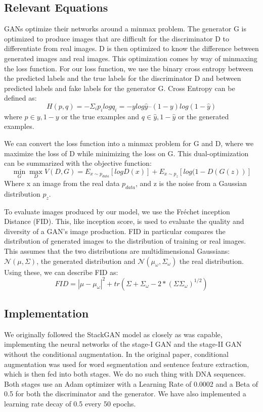 \documentclass{article}
\begin{document}
	\subsection{Relevant Equations}
	\label{sec:equations}
	GANs optimize their networks around a minmax problem. The generator G is optimized to produce images that are difficult for the discriminator D to differentiate from real images. D is then optimized to know the difference between generated images and real images. This optimization comes by way of minmaxing the loss function.
	For our loss function, we use the binary cross entropy between the predicted labels and the true labels for the discriminator D and between predicted labels and fake labels for the generator G. Cross Entropy can be defined as:
	\begin{equation}
		H(p,q) = -\Sigma_{i}p_{i} log q_{i} = -y log \hat{y} – (1-y) log (1-\hat{y})
	\end{equation}
	where $p \in {y, 1-y}$ or the true examples and $q \in {\hat{y} , 1-\hat{y}}$ or the generated examples.

	We can convert the loss function into a minmax problem for G and D, where we maximize the loss of D while minimizing the loss on G. This dual-optimization can be summarized with the objective function:
	\begin{equation}
		\min_{G} \max_{D} V(D,G)= E _{x \sim p_{data}}[log D(x)] + E _{x \sim p_{z}}[log (1-D(G(z))]
	\end{equation}
	Where x an image from the real data $p_{data}$, and z is the noise from a Gaussian distribution $p_{z}$.
	
	To evaluate images produced by our model, we use the Fréchet inception Distance (FID). This, like inception score, is used to evaluate the quality and diversity of a GAN’s image production. FID in particular compares the distribution of generated images to the distribution of training or real images. This assumes that the two distributions are multidimensional Gaussians: $\mathcal{N}(\mu, \Sigma)$, the generated distribution and $\mathcal{N}(\mu_{\omega}, \Sigma_{\omega})$ the real distribution. Using these, we can describe FID as:
	\begin{equation}
		FID = |\mu-\mu_{\omega}|^{2} + tr(\Sigma + \Sigma_{\omega} - 2*(\Sigma\Sigma_{\omega})^{1/2})
	\end{equation}

	\subsection{Implementation}
	We originally followed the StackGAN model as closely as was capable, implementing the neural networks of the stage-I GAN and the stage-II GAN without the conditional augmentation. In the original paper, conditional augmentation was used for word segmentation and sentence feature extraction, which is then fed into both stages. We do no such thing with DNA sequences. Both stages use an Adam optimizer with a Learning Rate of 0.0002 and a Beta of 0.5 for both the discriminator and the generator. We have also implemented a learning rate decay of 0.5 every 50 epochs.
\end{document}

